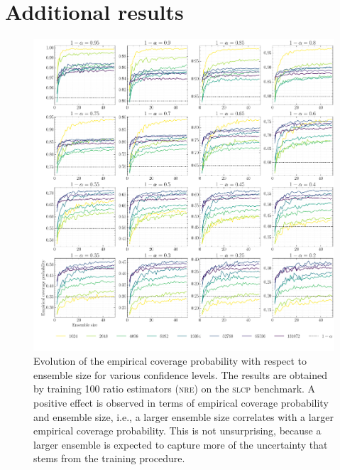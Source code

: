 \documentclass[twoside]{article}
\begin{document}
\section{Additional results}
\label{sec:additional_results}
\begin{figure}[h!]
    \centering
    \includegraphics[width=\linewidth]{figures/coverage_ensemble_size}
    \caption{Evolution of the empirical coverage probability with respect to ensemble size for various confidence levels. The results are obtained by training 100 ratio estimators (\textsc{nre}) on the \textsc{slcp} benchmark. A positive effect is observed in terms of empirical coverage probability and ensemble size, i.e., a larger ensemble size correlates with a larger empirical coverage probability. This is not unsurprising, because a larger ensemble is expected to capture more of the uncertainty that stems from the training procedure.}
    \label{fig:coverage_ensemble_size}
\end{figure}
\end{document}
